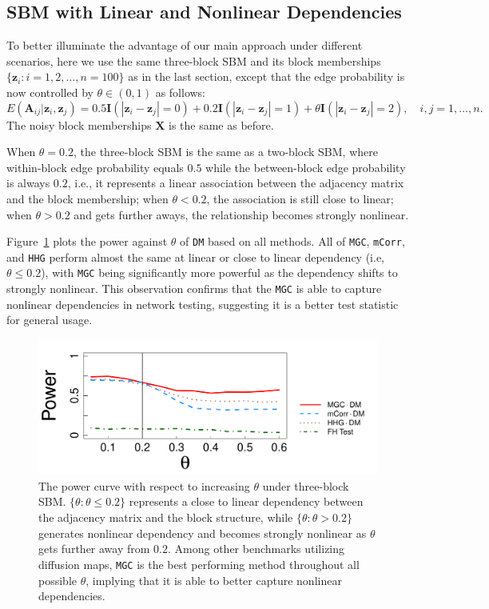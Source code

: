 \documentclass[11pt]{article}
\theoremstyle{definition}
\begin{document}
\subsection{SBM with Linear and Nonlinear Dependencies}
To better illuminate the advantage of our main approach under different scenarios, here we use the same three-block SBM and its block memberships $\{ \mathbf{z}_{i} : i=1,2, \ldots, n=100 \}$ as in the last section, except that the edge probability is now controlled by $\theta \in (0, 1)$ as follows:
\begin{equation}
E(\mathbf{A}_{ij} | \mathbf{z}_{i}, \mathbf{z}_{j}) = 0.5 \mathbf{I}(|\mathbf{z}_{i} - \mathbf{z}_{j}| = 0) + 0.2 \mathbf{I}(|\mathbf{z}_{i} - \mathbf{z}_{j}| = 1) + \theta \mathbf{I}(|\mathbf{z}_{i} - \mathbf{z}_{j}| = 2), \quad i,j = 1, \ldots, n.
\label{eq:mono}
\end{equation}
The noisy block memberships $\mathbf{X}$ is the same as before.

When $\theta = 0.2$, the three-block SBM is the same as a two-block SBM, where within-block edge probability equals $0.5$ while the between-block edge probability is always $0.2$, i.e., it represents a linear association between the adjacency matrix and the block membership; when $\theta<0.2$, the association is still close to linear; when $\theta > 0.2$ and gets further aways, the relationship becomes strongly nonlinear.

Figure~\ref{fig:powerplot} plots the power against $\theta$ of \texttt{DM} based on all methods. All of \texttt{MGC}, \texttt{mCorr}, and \texttt{HHG} perform almost the same at linear or close to linear dependency (i.e, $\theta \leq 0.2$), with \texttt{MGC} being significantly more powerful as the dependency shifts to strongly nonlinear. This observation confirms that the \texttt{MGC} is able to capture nonlinear dependencies in network testing, suggesting it is a better test statistic for general usage.

\begin{figure}[ht]
	\centering
	\includegraphics[width=0.7\linewidth]{../Figure/monoelbow3_t3.pdf}
	\caption{The power curve with respect to increasing $\theta$ under three-block SBM. $\{\theta : \theta \leq 0.2 \}$ represents a close to linear dependency between the adjacency matrix and the block structure, while $\{ \theta : \theta > 0.2 \}$ generates nonlinear dependency and becomes strongly nonlinear as $\theta$ gets further away from $0.2$. Among other benchmarks utilizing diffusion maps, \texttt{MGC} is the best performing method throughout all possible $\theta$, implying that it is able to better capture nonlinear dependencies.} 
	\label{fig:powerplot}
\end{figure}
\end{document}
